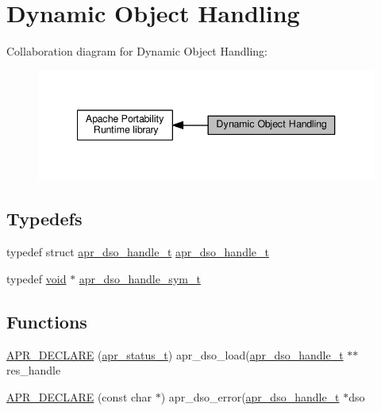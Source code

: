 \hypertarget{group__apr__dso}{}\section{Dynamic Object Handling}
\label{group__apr__dso}
Collaboration diagram for Dynamic Object Handling\+:
\nopagebreak
\begin{figure}[H]
\begin{center}
\leavevmode
\includegraphics[width=340pt]{group__apr__dso}
\end{center}
\end{figure}
\subsection*{Typedefs}
\begin{DoxyCompactItemize}
\item 
typedef struct \hyperlink{structapr__dso__handle__t}{apr\+\_\+dso\+\_\+handle\+\_\+t} \hyperlink{group__apr__dso_ga85e7e28490d026aeed78bd78e9933472}{apr\+\_\+dso\+\_\+handle\+\_\+t}
\item 
typedef \hyperlink{group__MOD__ISAPI_gacd6cdbf73df3d9eed42fa493d9b621a6}{void} $\ast$ \hyperlink{group__apr__dso_gaf1aa0a039e8003586cfdfbc4ac57e775}{apr\+\_\+dso\+\_\+handle\+\_\+sym\+\_\+t}
\end{DoxyCompactItemize}
\subsection*{Functions}
\begin{DoxyCompactItemize}
\item 
\hyperlink{group__apr__dso_ga38dbaa24de2913d588a461ee3fd13fae}{A\+P\+R\+\_\+\+D\+E\+C\+L\+A\+RE} (\hyperlink{group__apr__errno_gaa5105fa83cc322f09382292db8b47593}{apr\+\_\+status\+\_\+t}) apr\+\_\+dso\+\_\+load(\hyperlink{structapr__dso__handle__t}{apr\+\_\+dso\+\_\+handle\+\_\+t} $\ast$$\ast$res\+\_\+handle
\item 
\hyperlink{group__apr__dso_gaa5e20b97cabdb8164a4a924523a8b230}{A\+P\+R\+\_\+\+D\+E\+C\+L\+A\+RE} (const char $\ast$) apr\+\_\+dso\+\_\+error(\hyperlink{structapr__dso__handle__t}{apr\+\_\+dso\+\_\+handle\+\_\+t} $\ast$dso
\end{DoxyCompactItemize}

